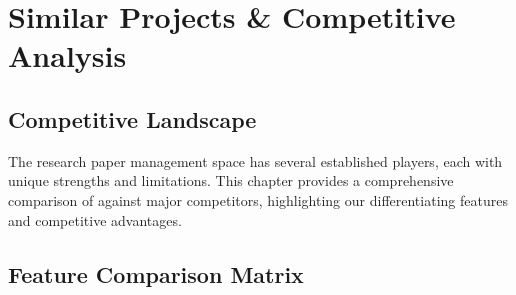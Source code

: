 \chapter{Similar Projects \& Competitive Analysis}
\label{ch:similar-projects}

\section{Competitive Landscape}
\label{sec:competitive-landscape}

The research paper management space has several established players, each with unique strengths and limitations. This chapter provides a comprehensive comparison of \projectname{} against major competitors, highlighting our differentiating features and competitive advantages.

\section{Feature Comparison Matrix}
\label{sec:feature-comparison}

